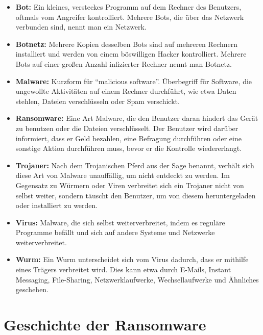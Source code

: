 		\begin{itemize}
			\item \textbf{Bot:} Ein kleines, versteckes Programm auf dem Rechner des Benutzers, oftmals vom Angreifer kontrolliert. Mehrere Bots, die über das Netzwerk verbunden sind, nennt man ein Netzwerk.
			\item \textbf{Botnetz:} Mehrere Kopien des­sel­ben Bots sind auf mehreren Rechnern installiert und werden von einem böswilligen Hacker kontrolliert. Mehrere Bots auf einer großen Anzahl infizierter Rechner nennt man Botnetz.
			\item \textbf{Malware:}	Kurzform für ``malicious software''. Überbegriff für Software, die ungewollte Aktivitäten auf einem Rechner durchführt, wie etwa Daten stehlen, Dateien verschlüsseln oder Spam verschickt.
			\item \textbf{Ransomware:} Eine Art Malware, die den Benutzer daran hindert das Gerät zu benutzen oder die Dateien verschlüsselt. Der Benutzer wird darüber informiert, dass er Geld bezahlen, eine Befragung durchführen oder eine sonstige Aktion durchführen muss, bevor er die Kontrolle wiedererlangt.
			\item \textbf{Trojaner:} Nach dem Trojanischen Pferd aus der Sage benannt, verhält sich diese Art von Malware unauffällig, um nicht entdeckt zu werden. Im Gegensatz zu Würmern oder Viren verbreitet sich ein Trojaner nicht von selbst weiter, sondern täuscht den Benutzer, um von diesem heruntergeladen oder installiert zu werden.
			\item \textbf{Virus:} Malware, die sich selbst weiterverbreitet, indem es reguläre Programme befällt und sich auf andere Systeme und Netzwerke weiterverbreitet.
			\item \textbf{Wurm:} Ein Wurm unterscheidet sich vom Virus dadurch, dass er mithilfe eines Trägers verbreitet wird. Dies kann etwa durch E-Mails, Instant Messaging, File-Sharing, Netzwerklaufwerke, Wechsellaufwerke und Ähnliches geschehen.
		\end{itemize}

\section{Geschichte der Ransomware}
\label{sec:geschichte}
